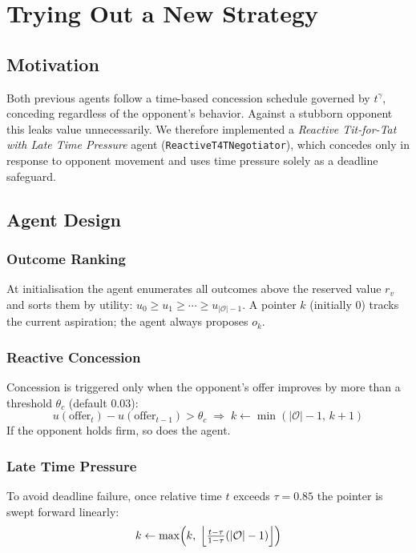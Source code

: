 \documentclass[../report.tex]{subfiles}
\begin{document}
\section{Trying Out a New Strategy}

\subsection{Motivation}

Both previous agents follow a time-based concession schedule governed by $t^\gamma$, conceding regardless of the opponent's behavior. Against a stubborn opponent this leaks value unnecessarily. We therefore implemented a \emph{Reactive Tit-for-Tat with Late Time Pressure} agent (\texttt{ReactiveT4TNegotiator}), which concedes only in response to opponent movement and uses time pressure solely as a deadline safeguard.

\subsection{Agent Design}

\subsubsection{Outcome Ranking}

At initialisation the agent enumerates all outcomes above the reserved value $r_v$ and sorts them by utility: $u_0 \geq u_1 \geq \cdots \geq u_{|\mathcal{O}|-1}$. A pointer $k$ (initially $0$) tracks the current aspiration; the agent always proposes $o_k$.

\subsubsection{Reactive Concession}

Concession is triggered only when the opponent's offer improves by more than a threshold $\theta_c$ (default $0.03$):
\[
  u(\text{offer}_t) - u(\text{offer}_{t-1}) > \theta_c \;\Rightarrow\; k \leftarrow \min(|\mathcal{O}|-1,\,k+1)
\]
If the opponent holds firm, so does the agent.

\subsubsection{Late Time Pressure}

To avoid deadline failure, once relative time $t$ exceeds $\tau = 0.85$ the pointer is swept forward linearly:
\[
  k \leftarrow \max\!\left(k,\;\Bigl\lfloor\tfrac{t-\tau}{1-\tau}(|\mathcal{O}|-1)\Bigr\rfloor\right)
\]
\end{document}
